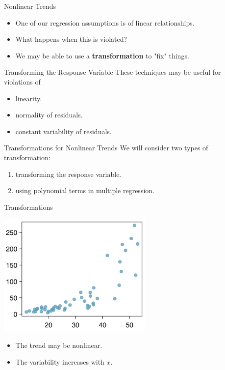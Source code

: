 \begin{frame}{Nonlinear Trends}
    \begin{itemize}
        \item One of our regression assumptions is of linear relationships.
        \item What happens when this is violated? 
        \item We may be able to use a \textbf{transformation} to "fix" things.
    \end{itemize}
\end{frame}

\begin{frame}{Transforming the Response Variable}
    These techniques may be useful for violations of
    \begin{itemize}
        \item linearity.
        \item normality of residuals.
        \item constant variability of residuals.
    \end{itemize}
\end{frame}

\begin{frame}{Transformations for Nonlinear Trends}
    We will consider two types of transformation:
    \begin{enumerate}
        \item transforming the response variable.
        \item using polynomial terms in multiple regression.
    \end{enumerate}
\end{frame}

\begin{frame}{Transformations}
    \begin{center}
        \includegraphics[width=3in]{images/nonlintrend1.png}
    \end{center}
    \vspace{-.75cm}\begin{itemize}
        \item The trend may be nonlinear.
        \item The variability increases with $x$.
    \end{itemize}
\end{frame}

